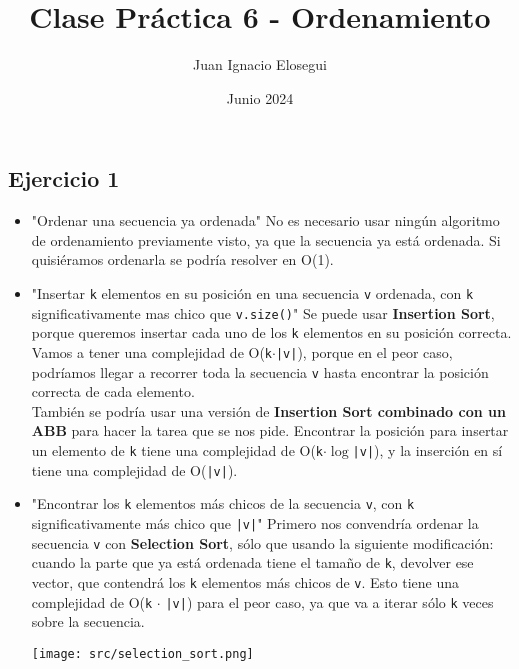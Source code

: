 \documentclass[12pt]{article}
\begin{document}
	\title{Clase Práctica 6 - Ordenamiento}
	\author{Juan Ignacio Elosegui}
	\date{Junio 2024}
	\maketitle                   

	\subsection*{Ejercicio 1}
		\begin{itemize}
			\item "Ordenar una secuencia ya ordenada" No es necesario usar ningún algoritmo de ordenamiento previamente visto, ya que la secuencia ya está ordenada. Si quisiéramos ordenarla se podría resolver en O(1).
			\item "Insertar \texttt{k} elementos en su posición en una secuencia \texttt{v} ordenada, con \texttt{k} significativamente mas chico que \texttt{v.size()}" Se puede usar \textbf{Insertion Sort}, porque queremos insertar cada uno de los \texttt{k} elementos en su posición correcta. Vamos a tener una complejidad de O(\texttt{k}$\cdot$\texttt{|v|}), porque en el peor caso, podríamos llegar a recorrer toda la secuencia \texttt{v} hasta encontrar la posición correcta de cada elemento.\\
			También se podría usar una versión de \textbf{Insertion Sort combinado con un ABB} para hacer la tarea que se nos pide. Encontrar la posición para insertar un elemento de \texttt{k} tiene una complejidad de O(\texttt{k}$\cdot \log$\texttt{|v|}), y la inserción en sí tiene una complejidad de O(\texttt{|v|}).
			\item "Encontrar los \texttt{k} elementos más chicos de la secuencia \texttt{v}, con \texttt{k} significativamente más chico que \texttt{|v|}" Primero nos convendría ordenar la secuencia \texttt{v} con \textbf{Selection Sort}, sólo que usando la siguiente modificación: cuando la parte que ya está ordenada tiene el tamaño de \texttt{k}, devolver ese vector, que contendrá los \texttt{k} elementos más chicos de \texttt{v}. Esto tiene una complejidad de O(\texttt{k} $\cdot$ \texttt{|v|}) para el peor caso, ya que va a iterar sólo \texttt{k} veces sobre la secuencia.
				\begin{center}
					\texttt{[image: src/selection\_sort.png]}\\
					

\end{center}
\end{itemize}
\end{document}

